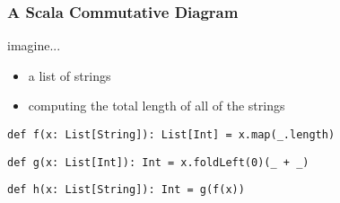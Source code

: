 \documentclass[include/preamble.tex]{subfiles}
\begin{document}
\begin{frame}[fragile]
  \frametitle{A Scala Commutative Diagram}
  \begin{center}
    \begin{flushleft}
      imagine...
    \end{flushleft}
    \begin{itemize}
      \pause
    \item a list of strings
      \pause
    \item computing the total length of all of the strings
    \end{itemize}
  \end{center}
\end{frame}

\begin{frame}[fragile]
  \begin{center}
    \newline
    \newline
    \begin{flushleft}

      \begin{lrbox}{\boxA}
        \begin{lstlisting}[style=scala]
def f(x: List[String]): List[Int] = x.map(_.length)
        \end{lstlisting}
      \end{lrbox}

      \begin{lrbox}{\boxB}
        \begin{lstlisting}[style=scala]
def g(x: List[Int]): Int = x.foldLeft(0)(_ + _)
        \end{lstlisting}
      \end{lrbox}

      \begin{lrbox}{\boxC}
        \begin{lstlisting}[style=scala]
def h(x: List[String]): Int = g(f(x))
        \end{lstlisting}
      \end{lrbox}


\end{flushleft}
\end{center}
\end{frame}
\end{document}
